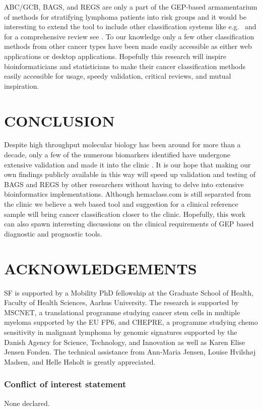 \documentclass[10pt]{bmc_article}
\newenvironment{bmcformat}{\fussy\setboolean{publ}{true}}{\fussy}
\begin{document}
\begin{bmcformat}
ABC/GCB, BAGS, and REGS are only a part of the GEP-based armamentarium of methods for stratifying lymphoma patients into risk groups and it would be interesting to extend the tool to include other classification systems like e.g.\ \cite{Shipp2002, Lossos2004a, Malumbres2008} and for a comprehensive review see \cite{Coutinho2013}.
To our knowledge only a few other classification methods from other cancer types have been made easily accessible as either web applications or desktop applications. Hopefully this research will inspire bioinformaticians and statisticians to make their cancer classification methods easily accessible for usage, speedy validation, critical reviews, and mutual inspiration.

\section*{CONCLUSION}
Despite high throughput molecular biology has been around for more than a decade, only a few of the numerous biomarkers identified have undergone extensive validation and made it into the clinic \cite{Chen2012a}. It is our hope that making our own findings publicly available in this way will speed up validation and testing of BAGS and REGS by other researchers without having to delve into extensive bioinformatics implementations. Although hemaclass.com is still separated from the clinic we believe a web based tool and suggestion for a clinical reference sample will bring cancer classification closer to the clinic. Hopefully, this work can also spawn interesting discussions on the clinical requirements of GEP based diagnostic and prognostic tools.


\section*{ACKNOWLEDGEMENTS}
SF is supported by a Mobility PhD fellowship at the Graduate School of Health, Faculty of Health Sciences, Aarhus University. The research is supported by MSCNET, a translational programme studying cancer stem cells in multiple myeloma supported by the EU FP6, and CHEPRE, a programme studying chemo sensitivity in malignant lymphoma by genomic signatures supported by the Danish Agency for Science, Technology, and Innovation as well as Karen Elise Jensen Fonden. The technical assistance from Ann-Maria Jensen, Louise Hvilsh\o j Madsen, and Helle H\o holt is greatly appreciated.

\subsubsection*{Conflict of interest statement}
None declared.


\end{bmcformat}
\end{document}

